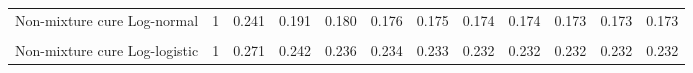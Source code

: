 \documentclass[
]{article}
\begin{document}
\begin{table}[H]
{\begin{tabular}[t]{lrrrrrrrrrrr}
Non-mixture cure Log-normal & 1 & 0.241 & 0.191 & 0.180 & 0.176 & 0.175 & 0.174 & 0.174 & 0.173 & 0.173 & 0.173\\
\cellcolor{gray!10}{Mixture cure Log-logistic} & \cellcolor{gray!10}{1} & \cellcolor{gray!10}{0.261} & \cellcolor{gray!10}{0.229} & \cellcolor{gray!10}{0.222} & \cellcolor{gray!10}{0.220} & \cellcolor{gray!10}{0.219} & \cellcolor{gray!10}{0.219} & \cellcolor{gray!10}{0.218} & \cellcolor{gray!10}{0.218} & \cellcolor{gray!10}{0.218} & \cellcolor{gray!10}{0.218}\\
Non-mixture cure Log-logistic & 1 & 0.271 & 0.242 & 0.236 & 0.234 & 0.233 & 0.232 & 0.232 & 0.232 & 0.232 & 0.232\\
\bottomrule
\end{tabular}}
\end{table}
\end{document}
